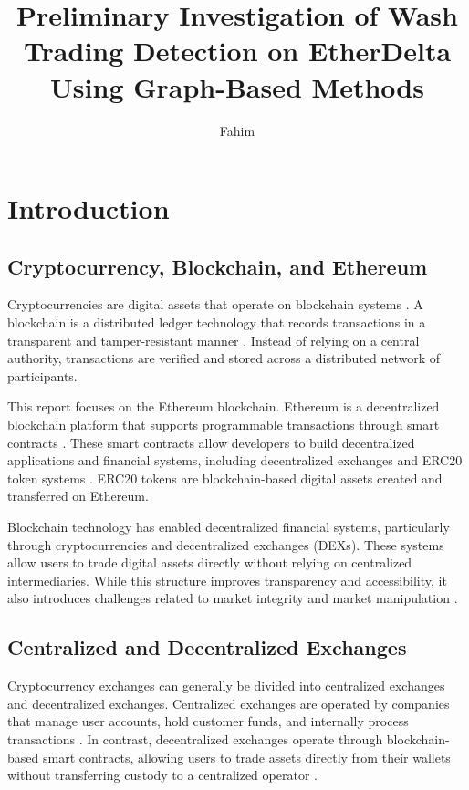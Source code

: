 \documentclass[language=english,thesis=bachelor,nosecondtitle,faculty=cb,onesided,13pt]{hsmw-thesis}
\title{Preliminary Investigation of Wash Trading Detection on EtherDelta Using Graph-Based Methods}
\author{Fahim}{Rafique}[B.Sc.]
\begin{document}

\chapter{Introduction}
	\section{Cryptocurrency, Blockchain, and Ethereum}		
Cryptocurrencies are digital assets that operate on blockchain systems \cite{nakamoto2008bitcoin}. A blockchain is a distributed ledger technology that records transactions in a transparent and tamper-resistant manner \cite{nakamoto2008bitcoin}. Instead of relying on a central authority, transactions are verified and stored across a distributed network of participants. 

This report focuses on the Ethereum blockchain. Ethereum is a decentralized blockchain platform that supports programmable transactions through smart contracts \cite{buterin2013next}. These smart contracts allow developers to build decentralized applications and financial systems, including decentralized exchanges and ERC20 token systems \cite{buterin2013next, fenu2018ico}. ERC20 tokens are blockchain-based digital assets created and transferred on Ethereum. 

Blockchain technology has enabled decentralized financial systems, particularly through cryptocurrencies and decentralized exchanges (DEXs). These systems allow users to trade digital assets directly without relying on centralized intermediaries. While this structure improves transparency and accessibility, it also introduces challenges related to market integrity and market manipulation \cite{cong2023crypto, pennec2021wash}.

	\section{Centralized and Decentralized Exchanges}
Cryptocurrency exchanges can generally be divided into centralized exchanges and decentralized exchanges. Centralized exchanges are operated by companies that manage user accounts, hold customer funds, and internally process transactions \cite{lin2019deconstructing}. In contrast, decentralized exchanges operate through blockchain-based smart contracts, allowing users to trade assets directly from their wallets without transferring custody to a centralized operator \cite{lin2019deconstructing, werner2021sok}.
\end{document}
